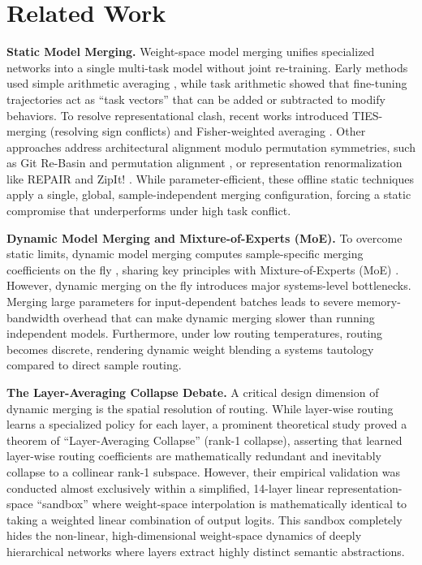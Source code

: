 \section{Related Work}
\label{sec:related_work}

\textbf{Static Model Merging.} Weight-space model merging unifies specialized networks into a single multi-task model without joint re-training. Early methods used simple arithmetic averaging \cite{wortsman2022model}, while task arithmetic \cite{ilharco2022editing} showed that fine-tuning trajectories act as ``task vectors'' that can be added or subtracted to modify behaviors. To resolve representational clash, recent works introduced TIES-merging \cite{yadav2023ties} (resolving sign conflicts) and Fisher-weighted averaging \cite{matena2022merging}. Other approaches address architectural alignment modulo permutation symmetries, such as Git Re-Basin \cite{ainsworth2022git, ainsworth2022linear} and permutation alignment \cite{pena2023permutation}, or representation renormalization like REPAIR \cite{jordan2022repair} and ZipIt! \cite{stoica2023zipit, stoica2024merging}. While parameter-efficient, these offline static techniques apply a single, global, sample-independent merging configuration, forcing a static compromise that underperforms under high task conflict.

\textbf{Dynamic Model Merging and Mixture-of-Experts (MoE).} To overcome static limits, dynamic model merging computes sample-specific merging coefficients on the fly \cite{gu2024zero, yadav2024resolving}, sharing key principles with Mixture-of-Experts (MoE) \cite{shazeer2017outrageously, fedus2022switch}. However, dynamic merging on the fly introduces major systems-level bottlenecks. Merging large parameters for input-dependent batches leads to severe memory-bandwidth overhead that can make dynamic merging slower than running independent models. Furthermore, under low routing temperatures, routing becomes discrete, rendering dynamic weight blending a systems tautology compared to direct sample routing.

\textbf{The Layer-Averaging Collapse Debate.} A critical design dimension of dynamic merging is the spatial resolution of routing. While layer-wise routing learns a specialized policy for each layer, a prominent theoretical study \cite{anonymous} proved a theorem of ``Layer-Averaging Collapse'' (rank-1 collapse), asserting that learned layer-wise routing coefficients are mathematically redundant and inevitably collapse to a collinear rank-1 subspace. 
However, their empirical validation was conducted almost exclusively within a simplified, 14-layer linear representation-space ``sandbox'' where weight-space interpolation is mathematically identical to taking a weighted linear combination of output logits. This sandbox completely hides the non-linear, high-dimensional weight-space dynamics of deeply hierarchical networks where layers extract highly distinct semantic abstractions.

